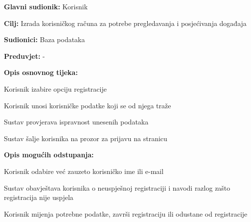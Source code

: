 					\noindent {}
					\begin{packed_item}
					\item \textbf{Glavni sudionik:} Korisnik
					\item  \textbf{Cilj:} Izrada korisničkog računa za potrebe pregledavanja i posjećivanja događaja
					\item  \textbf{Sudionici:} Baza podataka
					\item  \textbf{Preduvjet:} -
					\item  \textbf{Opis osnovnog tijeka:}
					
					\item[] \begin{packed_enum}
						
						\item Korisnik izabire opciju registracije
						\item Korisnik unosi korisničke podatke koji se od njega traže
						\item Sustav provjerava ispravnost unesenih podataka
						\item Sustav šalje korisnika na prozor za prijavu na stranicu
					\end{packed_enum}
					
					\item  \textbf{Opis mogućih odstupanja:}
					
					\item[] \begin{packed_item}
						
						\item[2.a] Korisnik odabire već zauzeto korisničko ime ili e-mail
						\item[] \begin{packed_enum}
							
							\item Sustav obavještava korisnika o neuspješnoj registraciji i navodi razlog zašto
							registracija nije uspjela
							\item Korisnik mijenja potrebne podatke, završi registraciju ili odustane od registracije
							
						\end{packed_enum}
					\end{packed_item}

				\end{packed_item}
				
